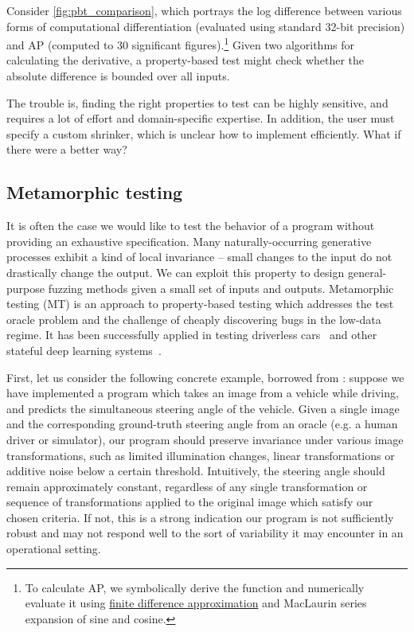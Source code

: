 %
Consider \autoref{fig:pbt_comparison}, which portrays the log difference between various forms of computational differentiation (evaluated using standard 32-bit precision) and AP (computed to 30 significant figures).\hspace{-.08em}\footnote{To calculate AP, we symbolically derive the function and numerically evaluate it using \hyperref[sec:fdm]{finite difference approximation} and MacLaurin series expansion of sine and cosine.} Given two algorithms for calculating the derivative, a property-based test might check whether the absolute difference is bounded over all inputs.

The trouble is, finding the right properties to test can be highly sensitive, and requires a lot of effort and domain-specific expertise. In addition, the user must specify a custom shrinker, which is unclear how to implement efficiently. What if there were a better way?

\subsection{Metamorphic testing}\label{subsec:metamorphic-testing}

It is often the case we would like to test the behavior of a program without providing an exhaustive specification. Many naturally-occurring generative processes exhibit a kind of local invariance -- small changes to the input do not drastically change the output. We can exploit this property to design general-purpose fuzzing methods given a small set of inputs and outputs. Metamorphic testing (MT) is an approach to property-based testing which addresses the test oracle problem and the challenge of cheaply discovering bugs in the low-data regime. It has been successfully applied in testing driverless cars~\citep{zhou2019metamorphic, pei2017deepxplore, tian2018deeptest} and other stateful deep learning systems~\citep{du2018deepcruiser}.

First, let us consider the following concrete example, borrowed from \citet{tian2018deeptest}: suppose we have implemented a program which takes an image from a vehicle while driving, and predicts the simultaneous steering angle of the vehicle. Given a single image and the corresponding ground-truth steering angle from an oracle (e.g. a human driver or simulator), our program should preserve invariance under various image transformations, such as limited illumination changes, linear transformations or additive noise below a certain threshold. Intuitively, the steering angle should remain approximately constant, regardless of any single transformation or sequence of transformations applied to the original image which satisfy our chosen criteria. If not, this is a strong indication our program is not sufficiently robust and may not respond well to the sort of variability it may encounter in an operational setting.

